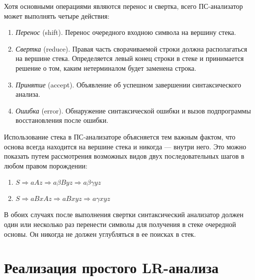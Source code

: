 \documentclass[bachelor, och, coursework, times]{SCWorks}
\begin{document}
Хотя основными операциями являются перенос и свертка, всего ПС-анализатор может выполнять четыре действия: 
\begin{enumerate}
    \item \textit {Перенос} (shift). Перенос очередного входною символа на вершину стека. 
    \item \textit {Свертка} (reduce). Правая часть сворачиваемой строки должна располагаться на вершине стека. Определяется левый конец строки в стеке и принимается решение о том, каким нетерминалом будет заменена строка. 
    \item \textit {Принятие} (accept). Объявление об успешном завершении синтаксического анализа. 
    \item \textit {Ошибка} (error). Обнаружение синтаксической ошибки и вызов подпрограммы восстановления после ошибки. 
\end{enumerate}

Использование стека в ПС-анализаторе объясняется тем важным фактом, что 
основа всегда находится на вершине стека и никогда — внутри него. Это можно 
показать путем рассмотрения возможных видов двух последовательных шагов 
в любом правом порождении:
\begin{enumerate}
    \item $S \Rightarrow aAz \Rightarrow a\beta Byz \Rightarrow a\beta \gamma yz$
    \item $S \Rightarrow aBxAz \Rightarrow aBxyz \Rightarrow a\gamma xyz$
\end{enumerate}



В обоих случаях после выполнения свертки синтаксический анализатор должен 
один или несколько раз перенести символы для получения в стеке очередной 
основы. Он никогда не должен углубляться в ее поисках в стек.~\cite{Sokolov}


\section{Реализация простого LR-анализа}
\end{document}
